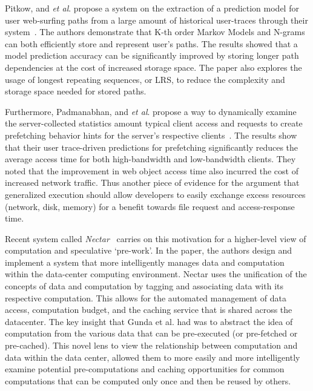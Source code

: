 Pitkow, and {\it et al}. propose a system on the extraction of a prediction
model for user web-surfing paths from a large amount of historical user-traces
through their system~\cite{pitkow}. The authors demonstrate that K-th order
Markov Models and N-grams can both efficiently store and represent user's paths.
The results showed that a model prediction accuracy can be significantly
improved by storing longer path dependencies at the cost of increased storage
space. The paper also explores the usage of longest repeating sequences, or
LRS, to reduce the complexity and storage space needed for stored paths.

Furthermore, Padmanabhan, and {\it et al}. propose a way to dynamically examine
the server-collected statistics amount typical client access and
requests to create prefetching behavior hints for the server's respective
clients~\cite{padmanabhan1996using}.  The results show that their user trace-driven
predictions for prefetching significantly reduces the average access time for
both high-bandwidth and low-bandwidth clients. They noted that the improvement
in web object access time also incurred the cost of increased network traffic.
Thus another piece of evidence for the argument that generalized execution
should allow developers to easily exchange excess resources (network, disk,
memory) for a benefit towards file request and access-response time.

Recent system called {\it Nectar}~\cite{nectar} carries on this motivation for a
higher-level view of computation and speculative `pre-work'. In the paper, the
authors design and implement a system that more intelligently manages data and
computation within the data-center computing environment. Nectar uses the
unification of the concepts of data and computation by tagging and associating
data with its respective computation. This allows for the automated management
of data access, computation budget, and the caching service that is shared
across the datacenter.
The key insight that Gunda et al. had was to abstract the idea of computation
from the various data that can be pre-executed (or pre-fetched or pre-cached).
This novel lens to view the relationship between computation and data within the
data center, allowed them to more easily and more intelligently examine
potential pre-computations and caching opportunities for common computations
that can be computed only once and then be reused by others.

